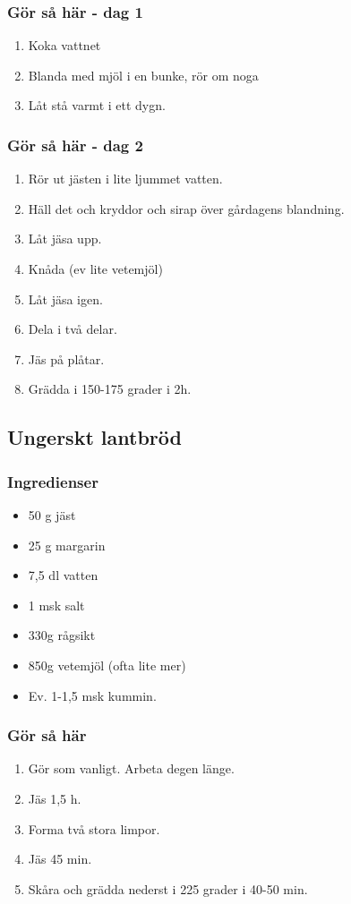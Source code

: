 \documentclass[a4paper,11pt,twocolumn]{article}
\begin{document}
\subsubsection*{Gör så här - dag 1}
\begin{enumerate}[label=\arabic*.]
    \item Koka vattnet
    \item Blanda med mjöl i en bunke, rör om noga
    \item Låt stå varmt i ett dygn.
\end{enumerate}
\subsubsection*{Gör så här - dag 2}
\begin{enumerate}[label=\arabic*.]
    \item Rör ut jästen i lite ljummet vatten.
    \item Häll det och kryddor och sirap över gårdagens blandning.
    \item Låt jäsa upp.
    \item Knåda (ev lite vetemjöl)
    \item Låt jäsa igen.
    \item Dela i två delar.
    \item Jäs på plåtar.
    \item Grädda i 150-175 grader i 2h.
\end{enumerate}


\subsection{Ungerskt lantbröd}
\subsubsection*{Ingredienser}
\begin{itemize}[noitemsep]
    \item 50 g jäst
    \item 25 g margarin
    \item 7,5 dl vatten
    \item 1 msk salt
    \item 330g rågsikt
    \item 850g vetemjöl (ofta lite mer)
    \item Ev. 1-1,5 msk kummin.
\end{itemize}
\subsubsection*{Gör så här}
\begin{enumerate}[label=\arabic*.]
    \item Gör som vanligt. Arbeta degen länge.
    \item Jäs 1,5 h.
    \item Forma två stora limpor.
    \item Jäs 45 min.
    \item Skåra och grädda nederst i 225 grader i 40-50 min.
\end{enumerate}
\end{document}

